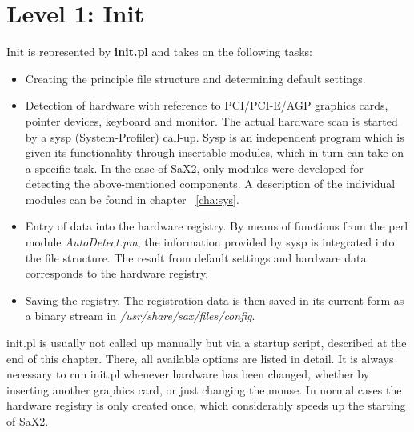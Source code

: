 \newpage

\section{Level 1: Init}
\label{sec:le1}
Init is represented by  \textbf{init.pl} and takes on the following tasks:\\
\begin{itemize}
\item Creating the principle file structure and determining default settings.
\item Detection of hardware with reference to PCI/PCI-E/AGP graphics cards,
  pointer devices, keyboard and monitor. The actual hardware scan is started
  by a sysp (System-Profiler) call-up. Sysp is an independent program which is
  given its functionality through insertable modules, which in turn can take on
  a specific task. In the case of SaX2, only modules were developed for
  detecting the above-mentioned components. A description of the individual
  modules can be found in chapter ~\ref{cha:sys}.
\item Entry of data into the hardware registry. By means of functions from the
  perl module \textit{AutoDetect.pm}, the information provided by sysp is
  integrated into the file structure. The result from default settings and
  hardware data corresponds to the hardware registry.
\item Saving the registry. The registration data is then saved in its current
  form as a binary stream in \textit{/usr/share/sax/files/config}. 
\end{itemize}

init.pl is usually not called up manually but via a startup script, described
at the end of this chapter. There, all available options are listed in
detail. It is always necessary to run init.pl whenever hardware has been
changed, whether by inserting another graphics card, or just changing the
mouse. In normal cases the hardware registry is only created once, which
considerably speeds up the starting of SaX2. 


